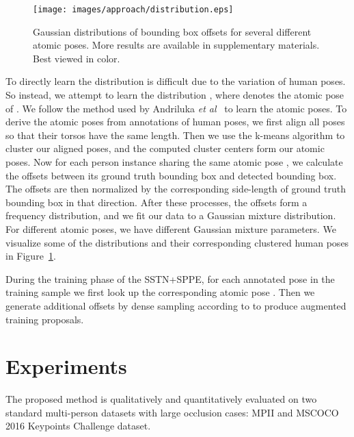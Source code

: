 \documentclass[10pt,twocolumn,letterpaper]{article}
\begin{document}
\begin{figure}[bt]
\begin{center}
   \texttt{[image: images/approach/distribution.eps]}
\end{center}
   \caption{Gaussian distributions of bounding box offsets for several different atomic poses. More results are available in supplementary materials. Best viewed in color.}
\vspace{-0.1in}
\label{fig:pose-distribution}
\end{figure}

\vspace{2mm}
 To directly learn the distribution  is difficult due to the variation of human poses. So instead, we attempt to learn the distribution , where  denotes the atomic pose~\cite{yao2012recognizing} of . We follow the method used by  Andriluka \emph{et al}~\cite{andriluka14cvpr} to learn the atomic poses. To derive the atomic poses from annotations of human poses, we first align all poses so that their torsos have the same length. Then we use the k-means algorithm to cluster our aligned poses, and the computed cluster centers form our atomic poses. Now for each person instance sharing the same atomic pose , we calculate the offsets between its ground truth bounding box and detected bounding box. The offsets are then normalized by the corresponding side-length of ground truth bounding box in that direction. After these processes, the offsets form a frequency distribution, and we fit our data to a Gaussian mixture distribution. For different atomic poses, we have different Gaussian mixture parameters. We visualize some of the distributions and their corresponding clustered human poses in Figure~\ref{fig:pose-distribution}.

\vspace{2mm}
 During the training phase of the SSTN+SPPE, for each annotated pose in the training sample we first look up the corresponding atomic pose . Then we generate additional offsets by dense sampling according to  to produce augmented training proposals.

\section{Experiments}
\label{Experiments}
The proposed method is qualitatively and quantitatively evaluated on two standard multi-person datasets with large occlusion cases: MPII \cite{andriluka14cvpr} and MSCOCO 2016 Keypoints Challenge dataset\cite{coco16}.
\end{document}
